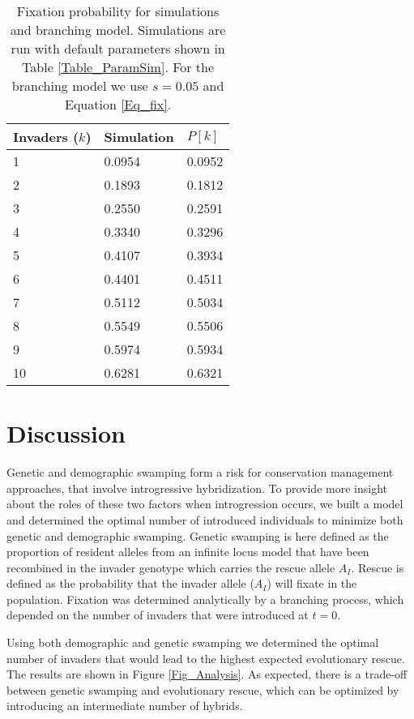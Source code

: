 \documentclass[a4paper,10pt]{article}
\begin{document}
	\begin{table}[]
	\centering
	\caption{Fixation probability for simulations and branching model. Simulations are run with default parameters shown in Table \ref{Table_ParamSim}. For the branching model we use $s = 0.05$ and Equation \ref{Eq_fix}.}
	\label{Table_FixationProbability}
	\begin{tabular}{lll}
	\textbf{Invaders ($k$)} 	& \textbf{Simulation}	& \textbf{$P[k]$} \\ \hline
	1				& 0.0954		& 0.0952  	\\
	2				& 0.1893		& 0.1812  	\\
	3				& 0.2550		& 0.2591 	\\   
	4				& 0.3340		& 0.3296	\\
	5				& 0.4107		& 0.3934	\\
	6				& 0.4401		& 0.4511	\\
	7				& 0.5112		& 0.5034	\\
	8				& 0.5549		& 0.5506	\\
	9				& 0.5974		& 0.5934	\\
	10				& 0.6281		& 0.6321 	
	\end{tabular}
	\end{table}

	\section*{Discussion}
	
	Genetic and demographic swamping form a risk for conservation management approaches, that involve introgressive hybridization. To provide more insight about the roles of these two factors when introgression occurs, we built a model and determined the optimal number of introduced individuals to minimize both genetic and demographic swamping. Genetic swamping is here defined as the proportion of resident alleles from an infinite locus model that have been recombined in the invader genotype which carries the rescue allele $A_I$. Rescue is defined as the probability that the invader allele ($A_I$) will fixate in the population. Fixation was determined analytically by a branching process, which depended on the number of invaders that were introduced at $t=0$.  
	
	Using both demographic and genetic swamping we determined the optimal number of invaders that would lead to the highest expected evolutionary rescue. The results are shown in Figure \ref{Fig_Analysis}. As expected, there is a trade-off between genetic swamping and evolutionary rescue, which can be optimized by introducing an intermediate number of hybrids.
	
\end{document}
